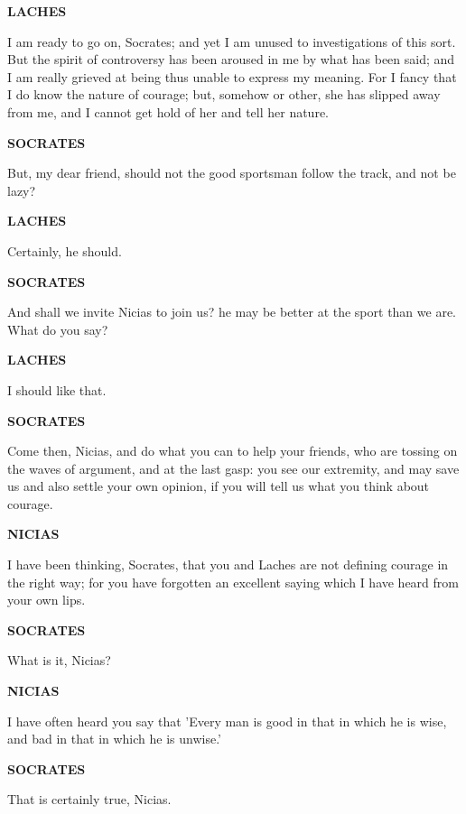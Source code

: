 \documentclass[11pt,letter]{article}
\begin{document}
\par \textbf{LACHES}
\par   I am ready to go on, Socrates; and yet I am unused to investigations of this sort. But the spirit of controversy has been aroused in me by what has been said; and I am really grieved at being thus unable to express my meaning. For I fancy that I do know the nature of courage; but, somehow or other, she has slipped away from me, and I cannot get hold of her and tell her nature.

\par \textbf{SOCRATES}
\par   But, my dear friend, should not the good sportsman follow the track, and not be lazy?

\par \textbf{LACHES}
\par   Certainly, he should.

\par \textbf{SOCRATES}
\par   And shall we invite Nicias to join us? he may be better at the sport than we are. What do you say?

\par \textbf{LACHES}
\par   I should like that.

\par \textbf{SOCRATES}
\par   Come then, Nicias, and do what you can to help your friends, who are tossing on the waves of argument, and at the last gasp:  you see our extremity, and may save us and also settle your own opinion, if you will tell us what you think about courage.

\par \textbf{NICIAS}
\par   I have been thinking, Socrates, that you and Laches are not defining courage in the right way; for you have forgotten an excellent saying which I have heard from your own lips.

\par \textbf{SOCRATES}
\par   What is it, Nicias?

\par \textbf{NICIAS}
\par   I have often heard you say that 'Every man is good in that in which he is wise, and bad in that in which he is unwise.'

\par \textbf{SOCRATES}
\par   That is certainly true, Nicias.
\end{document}
